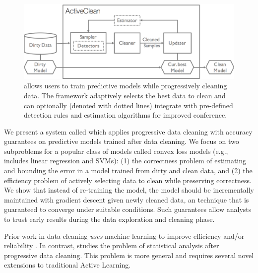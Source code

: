 \begin{figure}[t]
\centering
 \includegraphics[width=\columnwidth]{figs/arch.png}
 \caption{\sysfull allows users to train predictive models while progressively cleaning data. The framework adaptively selects the best data to clean and can optionally (denoted with dotted lines) integrate with pre-defined detection rules and estimation algorithms for improved conference. \label{sys-arch}}\vspace{-2em}
\end{figure}

We present a system called \sys which applies progressive data cleaning with accuracy guarantees on predictive models trained after data cleaning.
We focus on two subproblems for a popular class of models called convex loss models (e.g., includes linear regression and SVMs): (1) the correctness problem of estimating and bounding the error in a model trained from dirty and clean data, and (2) the efficiency problem of actively selecting data to clean while preserving correctness.
We show that instead of re-training the model, the model should be incrementally maintained with gradient descent given newly cleaned data, an technique that is guaranteed to converge under suitable conditions.
Such guarantees allow analysts to trust early results during the data exploration and cleaning phase.

Prior work in data cleaning \emph{uses} machine learning to improve efficiency and/or reliability \cite{DBLP:journals/pvldb/YakoutENOI11, gokhale2014corleone, yakout2013don, DBLP:journals/pvldb/HaasKWF015}.
In contrast, \sys studies the problem of statistical analysis after progressive data cleaning.
This problem is more general and requires several novel extensions to traditional Active Learning.






